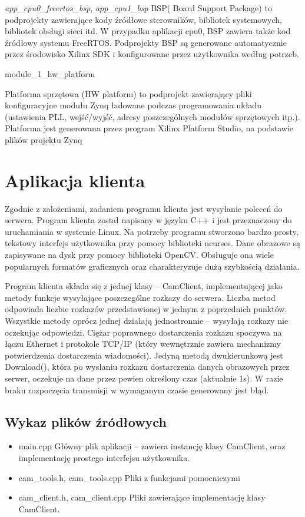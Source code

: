\documentclass[a4paper,11pt,oneside]{report}  %
\begin{document}
\textit{app\_cpu0\_freertos\_bsp}, \textit{app\_cpu1\_bsp} BSP( Board Support Package) to podprojekty zawierające kody źródłowe sterowników, bibliotek systemowych, bibliotek obsługi sieci itd. W przypadku aplikacji cpu0, BSP zawiera także kod źródłowy systemu FreeRTOS. Podprojekty BSP są generowane automatycznie przez środowisko Xilinx SDK i konfigurowane przez użytkownika według potrzeb.

module\_1\_hw\_platform

Platforma sprzętowa (HW platform) to podprojekt zawierający pliki konfiguracyjne modułu Zynq ładowane podczas programowania układu (ustawienia PLL, wejść/wyjść, adresy poszczególnych modułów sprzętowych itp.). Platforma jest generowana przez program Xilinx Platform Studio, na podstawie plików projektu Zynq


\section{Aplikacja klienta}
Zgodnie z założeniami, zadaniem programu klienta jest wysyłanie poleceń do serwera. Program klienta został napisany w języku C++ i jest przeznaczony do uruchamiania w systemie Linux. Na potrzeby programu stworzono bardzo prosty, tekstowy interfejs użytkownika przy pomocy biblioteki ncurses. Dane obrazowe są zapisywane na dysk przy pomocy biblioteki OpenCV. Obsługuje ona wiele popularnych formatów graficznych oraz charakteryzuje dużą szybkością działania.

Program klienta składa się z jednej klasy – CamClient, implementującej jako metody funkcje wysyłające poszczególne rozkazy do serwera. Liczba metod odpowiada liczbie rozkazów przedstawionej w jednym z poprzednich punktów. Wszystkie metody oprócz jednej działają jednostronnie – wysyłają rozkazy nie oczekując odpowiedzi. Ciężar poprawnego dostarczenia rozkazu spoczywa na łączu Ethernet i protokole TCP/IP (który wewnętrznie zawiera mechanizmy potwierdzenia dostarczenia wiadomości). Jedyną metodą dwukierunkową jest Download(), która po wysłaniu rozkazu dostarczenia danych obrazowych przez serwer, oczekuje na dane przez pewien określony czas (aktualnie 1s). W razie braku rozpoczęcia transmisji w wymaganym czasie generowany jest błąd.

\subsection{Wykaz plików źródłowych}
\begin{itemize}
\item main.cpp Główny plik aplikacji – zawiera instancję klasy CamClient, oraz implementację prostego interfejsu użytkownika.
\item cam\_tools.h, cam\_tools.cpp Pliki z funkcjami pomocniczymi 
\item cam\_client.h, cam\_client.cpp Pliki zawierające implementację klasy CamClient.

\end{itemize}
\end{document}
